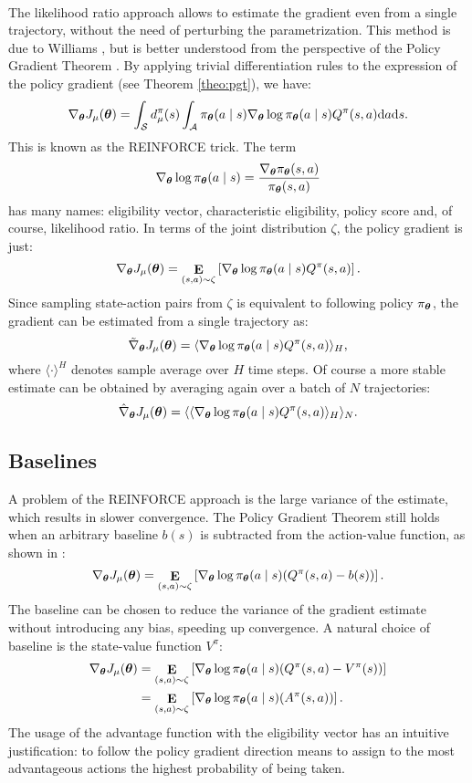 \paragraph{} %
The likelihood ratio approach allows to estimate the gradient even from a single trajectory, without the need of perturbing the parametrization. This method is due to Williams \cite{Williams1992}, but is better understood from the perspective of the Policy Gradient Theorem \cite{Sutton1999a}.
By applying trivial differentiation rules to the expression of the policy gradient (see Theorem \ref{theo:pgt}), we have:
\[
	\nabla_{\boldsymbol{\theta}}J_\mu(\boldsymbol{\theta}) = \int_{\mathcal{S}}d_{\mu}^{\pi}(s)
		\int_{\mathcal{A}}\pi_{\boldsymbol{\theta}}(a \mid s)\nabla_{\boldsymbol{\theta}}\log\pi_{\boldsymbol{\theta}}(a \mid s)
		Q^{\pi}(s,a)\mathrm{d}a\mathrm{d}s.
\]
This is known as the REINFORCE trick. The term
\[
	\nabla_{\boldsymbol{\theta}}\log\pi_{\boldsymbol{\theta}}(a \mid s) = \frac{\nabla_{\boldsymbol{\theta}}\pi_{\boldsymbol{\theta}}(s,a)}{\pi_{\boldsymbol{\theta}}(s,a)}
\]
has many names: eligibility vector, characteristic eligibility, policy score and, of course, likelihood ratio.
In terms of the joint distribution $\zeta$, the policy gradient is just:
\[
	\nabla_{\boldsymbol{\theta}}J_\mu(\boldsymbol{\theta}) = \mathop{\mathbf{E}}_{(s,a)\sim\zeta}\left[\nabla_{\boldsymbol{\theta}}\log\pi_{\boldsymbol{\theta}}(a \mid s) Q^{\pi}(s,a)\right].
\]
Since sampling state-action pairs from $\zeta$ is equivalent to following policy $\pi_{\boldsymbol{\theta}}$, the gradient can be estimated from a single trajectory as:
\[
	\tilde{\nabla}_{\boldsymbol{\theta}}J_{\mu}(\boldsymbol{\theta}) = \langle\nabla_{\boldsymbol{\theta}}\log\pi_{\boldsymbol{\theta}}(a \mid s) Q^{\pi}(s,a)\rangle_H,
\]
where $\langle\cdot\rangle^H$ denotes sample average over $H$ time steps. Of course a more stable estimate can be obtained by averaging again over a batch of $N$ trajectories:
\[
	\hat{\nabla}_{\boldsymbol{\theta}}J_{\mu}(\boldsymbol{\theta}) = \langle\langle\nabla_{\boldsymbol{\theta}}\log\pi_{\boldsymbol{\theta}}(a \mid s) Q^{\pi}(s,a)\rangle_H\rangle_N.
\]

\subsection{Baselines}
A problem of the REINFORCE approach is the large variance of the estimate, which results in slower convergence.
The Policy Gradient Theorem still holds when an arbitrary baseline $b(s)$ is subtracted from the action-value function, as shown in \cite{Williams1992}:
\[
	\nabla_{\boldsymbol{\theta}}J_\mu(\boldsymbol{\theta}) = \mathop{\mathbf{E}}_{(s,a)\sim\zeta}
		\left[\nabla_{\boldsymbol{\theta}}\log\pi_{\boldsymbol{\theta}}(a \mid s) (Q^{\pi}(s,a) - b(s))\right].
\]
The baseline can be chosen to reduce the variance of the gradient estimate without introducing any bias, speeding up convergence. A natural choice of baseline is the state-value function $V^{\pi}$:
\begin{align*}
	\nabla_{\boldsymbol{\theta}}J_\mu(\boldsymbol{\theta}) &= \mathop{\mathbf{E}}_{(s,a)\sim\zeta}
		\left[\nabla_{\boldsymbol{\theta}}\log\pi_{\boldsymbol{\theta}}(a \mid s) (Q^{\pi}(s,a) - V^{\pi}(s))\right] \\
		&= \mathop{\mathbf{E}}_{(s,a)\sim\zeta}
				\left[\nabla_{\boldsymbol{\theta}}\log\pi_{\boldsymbol{\theta}}(a \mid s) (A^{\pi}(s,a))\right].
\end{align*}
The usage of the advantage function with the eligibility vector has an intuitive justification: to follow the policy gradient direction means to assign to the most advantageous actions the highest probability of being taken. 

